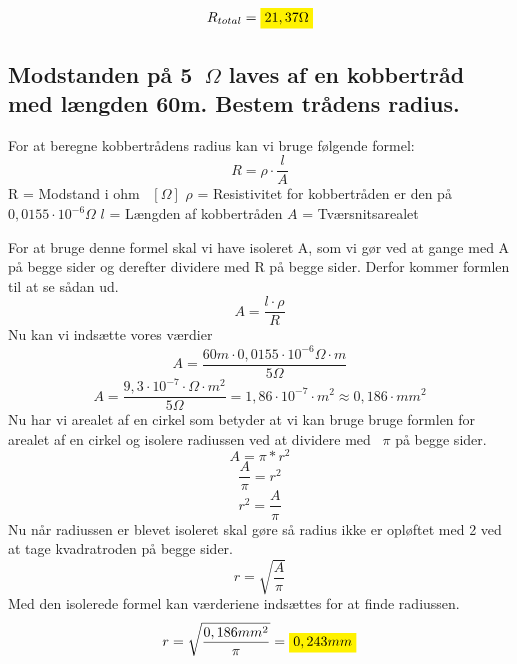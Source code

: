 \begin{equation*}
    R_{total}=\mathcolorbox{yellow}{21,37\Omega}
\end{equation*}

\subsection{Modstanden på 5~$\Omega$ laves af en kobbertråd med længden 60m. Bestem trådens radius.}
For at beregne kobbertrådens radius kan vi bruge følgende formel:
\begin{equation*}
    R=\rho\cdot\frac{l}{A}
\end{equation*}
R = Modstand i ohm ~$\left[ \Omega \right]$\newline
    $\rho$ = Resistivitet for kobbertråden er den på $0,0155 \cdot 10^{-6} \Omega$ \newline
    $l$ = Længden af kobbertråden\newline
    $A$ = Tværsnitsarealet\newline

For at bruge denne formel skal vi have isoleret A, som vi gør ved at gange med A på begge sider og derefter dividere med R på begge sider. Derfor kommer formlen til at se sådan ud.
\begin{equation*}
    A=\frac{l\cdot\rho}{R}
\end{equation*}
Nu kan vi indsætte vores værdier
\begin{equation*}
    A=\frac{60m\cdot0,0155 \cdot 10^{-6} \Omega \cdot m}{5\Omega}
\end{equation*}
\begin{equation*}
    A = \frac{9,3 \cdot 10^{-7} \cdot \Omega \cdot m^{2}}{5 \Omega} = 1,86 \cdot 10^{-7} \cdot m^{2} \approx 0,186 \cdot mm^{2}
\end{equation*}
Nu har vi arealet af en cirkel som betyder at vi kan bruge bruge formlen for arealet af en cirkel og isolere radiussen ved at dividere med ~$\pi$ på begge sider.
\begin{equation*}
    A=\pi*r^{2}
\end{equation*}
\begin{equation*}
    \frac{A}{\pi}=r^{2}
\end{equation*}
\begin{equation*}
    r^{2}=\frac{A}{\pi}
\end{equation*}
Nu når radiussen er blevet isoleret skal gøre så radius ikke er opløftet med 2 ved at tage kvadratroden på begge sider.
\begin{equation*}
    r=\sqrt{\frac{A}{\pi}}
\end{equation*}
Med den isolerede formel kan værderiene indsættes for at finde radiussen.
\begin{equation*}
    r=\sqrt{\frac{0,186mm^{2}}{\pi}} = \mathcolorbox{yellow}{0,243 mm}
\end{equation*}
\newpage
